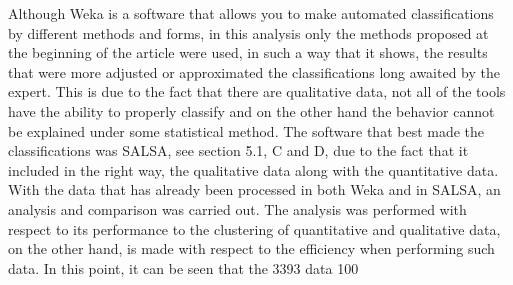 Although Weka is a software that allows you to make automated classifications by different methods and forms, in this analysis only the methods proposed at the beginning of the article were used, in such a way that it shows, the results that were more adjusted or approximated the classifications long awaited by the expert. This is due to the fact that there are qualitative data, not all of the tools have the ability to properly classify and on the other hand the behavior cannot be explained under some statistical method. The software that best made the classifications was SALSA, see section 5.1, C and D, due to the fact that it included in the right way, the qualitative data along with the quantitative data.
With the data that has already been processed in both Weka and in SALSA, an analysis and comparison was carried out. The analysis was performed with respect to its performance to the clustering of quantitative and qualitative data, on the other hand, is made with respect to the efficiency when performing such data. In this point, it can be seen that the 3393 data 100 %
